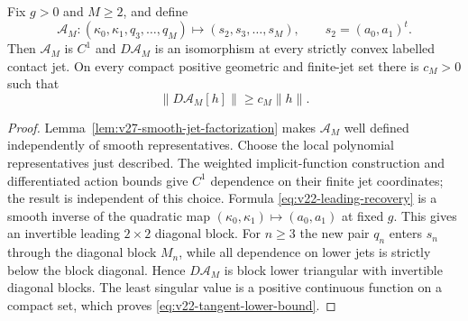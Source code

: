 \begin{proposition}
\label{prop:v22-tangent-jet-isomorphism}
Fix $g>0$ and $M\ge2$, and define
\[
 \mathscr A_M:
 (\kappa_0,\kappa_1,q_3,\ldots,q_M)
 \longmapsto(s_2,s_3,\ldots,s_M),
 \qquad s_2=(a_0,a_1)^t.
\]
Then $\mathscr A_M$ is $C^1$ and $D\mathscr A_M$ is an isomorphism at every
strictly convex labelled contact jet.  On every compact positive geometric
and finite-jet set there is $c_M>0$ such that
\begin{equation}\label{eq:v22-tangent-lower-bound}
                    \|D\mathscr A_M[h]\|\ge c_M\|h\|.
\end{equation}
\end{proposition}

\begin{proof}
Lemma~\ref{lem:v27-smooth-jet-factorization} makes $\mathscr A_M$
well defined independently of smooth representatives.  Choose the local
polynomial representatives just described.  The weighted implicit-function
construction and differentiated action bounds give $C^1$ dependence on
their finite jet coordinates; the result is independent of this choice.  Formula \eqref{eq:v22-leading-recovery} is a smooth inverse of
the quadratic map
$(\kappa_0,\kappa_1)\mapsto(a_0,a_1)$ at fixed $g$.  This gives an invertible
leading $2\times2$ diagonal block.  For $n\ge3$ the new pair $q_n$ enters
$s_n$ through the diagonal block $M_n$, while all dependence on lower jets is
strictly below the block diagonal.  Hence $D\mathscr A_M$ is block lower
triangular with invertible diagonal blocks.  The least singular value is a
positive continuous function on a compact set, which proves
\eqref{eq:v22-tangent-lower-bound}.
\end{proof}

